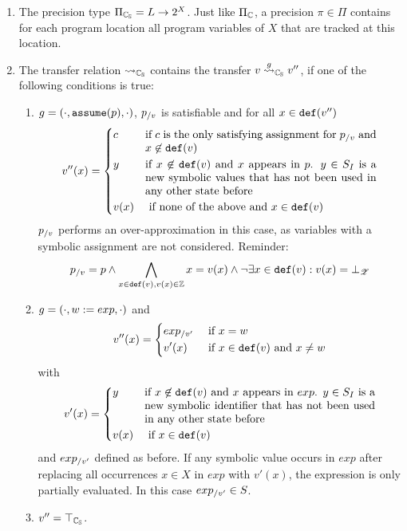 \begin{enumerate}[leftmargin=*, label=\arabic*.]
\item The precision type $\Pi_{\mathbb{C_{S}}} = L \rightarrow 2^X$. Just like $\Pi_{\mathbb{C}}$, a precision $\pi \in \Pi$ contains for each program location all program variables of $X$ that are tracked at this location.

\item The transfer relation $\rightsquigarrow_{\mathbb{C_{S}}}$ contains the transfer $v \overset{g}{\rightsquigarrow}_{\mathbb{C_{S}}} v''$, if one of the following conditions is true:
	\begin{enumerate}[label = \alph*)]
		\item $g = (\cdot, \texttt{assume}(p), \cdot)$, $p_{/v}$ is satisfiable and for all $x \in \texttt{def}(v'')$
			\[ v''(x) = \begin{dcases}
				c & \parbox[t]{.6\textwidth}{ if $c$ is the only satisfying assignment for $p_\using{v}$ and $x \not\in \defRange(v)$}\\
				y & \parbox[t]{.6\textwidth}{ if $x \not\in \defRange(v)$ and $x$  appears in $p$. $y \in \symIds$ is a new symbolic values that has not been used in any other state before}\\
				v(x) & \text{ if none of the above and } x \in \defRange(v)
			\end{dcases}\]
			$p_{/v}$ performs an over-approximation in this case, as variables with a symbolic assignment are not considered.
			Reminder: \[p_{/v} = p \wedge \bigwedge\limits_{x \in \texttt{def}(v), v(x) \in \mathbb{Z}}  x = v(x) \wedge \neg \exists x \in \texttt{def}(v) : v(x) = \bot_{\mathscr{Z}}\]

		\item $g = (\cdot, w := exp, \cdot)$ and
			\[ v''(x) = \begin{dcases}
				exp_{/v'} & \text{ if } x = w\\
				v'(x) & \text{ if } x \in \texttt{def}(v) \text{ and } x \neq w
			\end{dcases}\]
			with
			\[v'(x) = \begin{dcases}
				y & \parbox[t]{.6\textwidth}{if $x \not \in \defRange(v)$ and $x$ appears in $exp$. $y \in \symIds$ is a new symbolic identifier that has not been used in any other state before}\\
				v(x) & \text{ if } x \in \defRange(v)
			\end{dcases}\]
			and $exp_{/v'}$ defined as before. If any symbolic value occurs in $exp$ after replacing all occurrences $x \in X$ in $exp$ with $v'(x)$,
			the expression is only partially evaluated. In this case $exp_{/v'} \in S$.
		\item $v'' = \top_{\mathbb{C_{S}}}$.
	\end{enumerate}


\end{enumerate}
